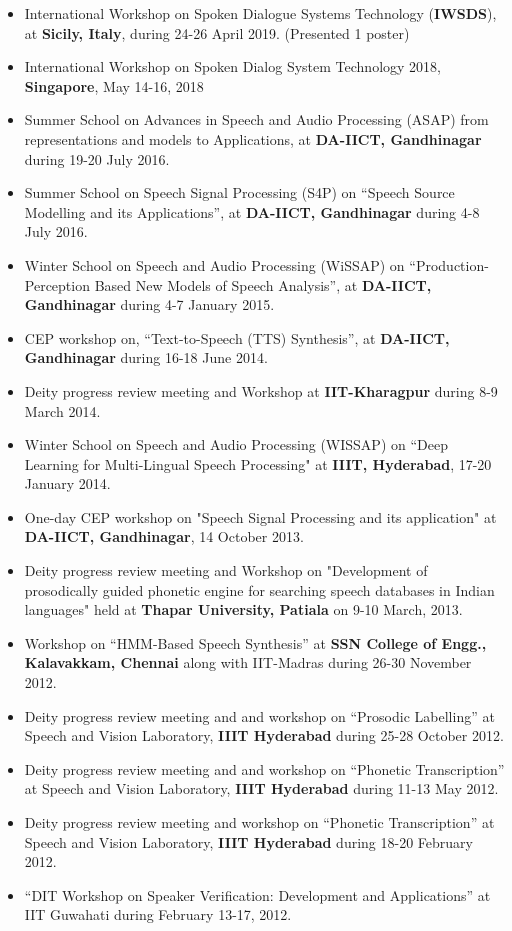 \documentclass[10pt]{article}
\begin{document}
\begin{itemize}
			\setlength\itemsep{0.15em}
\item International Workshop on Spoken Dialogue Systems Technology (\textbf{IWSDS}),  at \textbf{Sicily, Italy}, during 24-26 April 2019. (Presented 1 poster)
\item International Workshop on Spoken Dialog System Technology 2018, \textbf{Singapore}, May 14-16, 2018
\item Summer School on Advances in Speech and Audio Processing (ASAP) from representations and models to Applications, at \textbf{DA-IICT, Gandhinagar} during 19-20 July 2016.
\item Summer School on Speech Signal Processing (S4P) on ``Speech Source Modelling and its Applications'', at \textbf{DA-IICT, Gandhinagar} during 4-8 July 2016.
\item Winter School on Speech and Audio Processing (WiSSAP) on ``Production-Perception Based New Models of Speech Analysis'', at \textbf{DA-IICT, Gandhinagar} during 4-7 January 2015.
\item CEP workshop on, ``Text-to-Speech (TTS) Synthesis'', at \textbf{DA-IICT, Gandhinagar} during 16-18 June 2014.
\item Deity progress review meeting and Workshop at \textbf{IIT-Kharagpur} during 8-9 March 2014.
\item Winter School on Speech and Audio Processing (WISSAP) on ``Deep Learning for Multi-Lingual Speech Processing" at \textbf{IIIT, Hyderabad}, 17-20 January 2014.
\item One-day CEP workshop on "Speech Signal Processing and its application" at \textbf{DA-IICT, Gandhinagar}, 14  October 2013.
\item Deity progress review meeting and Workshop on "Development of prosodically guided phonetic engine for 
searching speech databases in Indian languages" held at \textbf{Thapar University, Patiala} on 9-10 March, 2013.
\item Workshop on ``HMM-Based Speech Synthesis'' at \textbf{SSN College of Engg., Kalavakkam, Chennai} along with IIT-Madras during 26-30 November 2012. 

\item Deity progress review meeting and and workshop on ``Prosodic Labelling''  at Speech and Vision Laboratory, \textbf{IIIT Hyderabad} during 
25-28 October 2012.
\item Deity progress review meeting and and workshop on ``Phonetic Transcription''  at Speech and Vision Laboratory, \textbf{IIIT Hyderabad} during 
11-13 May 2012.
\item Deity progress review meeting and workshop on ``Phonetic Transcription'' at Speech and Vision Laboratory, \textbf{IIIT Hyderabad} during  18-20 February 2012.
\item ``DIT Workshop on Speaker Verification: Development and Applications'' at IIT Guwahati during February 13-17, 2012.
\end{itemize}
\end{document}
